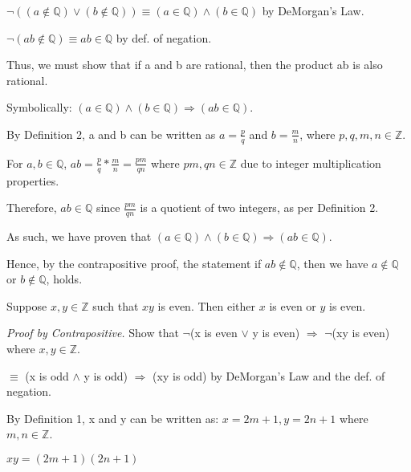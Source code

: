 \documentclass[a4paper,11pt]{article}
\begin{document}
$\neg ((a \not \in \mathbb{Q}) \vee (b \not \in \mathbb{Q})) \equiv (a \in \mathbb{Q}) \land (b \in \mathbb{Q})$ by DeMorgan's Law.

$\neg(ab \not \in \mathbb{Q}) \equiv ab \in \mathbb{Q}$ by def. of negation.

Thus, we must show that if a and b are rational, then the product ab is also rational.

Symbolically: $(a \in \mathbb{Q}) \land (b \in \mathbb{Q}) \Rightarrow (ab \in \mathbb{Q})$.

\phantom{}

By Definition 2, a and b can be written as $a = \frac{p}{q}$ and $b = \frac{m}{n}$, where $p,q,m,n \in \mathbb{Z}$.

For $a,b \in \mathbb{Q}$, $ab = \frac{p}{q}*\frac{m}{n} = \frac{pm}{qn}$ where $pm, qn \in \mathbb{Z}$ due to integer multiplication properties.

Therefore, $ab \in \mathbb{Q}$ since $\frac{pm}{qn}$ is a quotient of two integers, as per Definition 2.

As such, we have proven that $(a \in \mathbb{Q}) \land (b \in \mathbb{Q}) \Rightarrow (ab \in \mathbb{Q})$. 

\phantom{}

Hence, by the contrapositive proof, the statement if $ab \not \in \mathbb{Q}$, then we have $a \not \in \mathbb{Q}$ or $b \not \in \mathbb{Q}$, holds. \fbox \\

\begin{required}
Suppose $x, y \in \mathbb{Z}$ such that $xy$ is even. Then either $x$ is even or $y$ is even.
\end{required}
\emph{Proof by Contrapositive.} Show that $\neg$(x is even $\vee$ y is even) $\Rightarrow$ $\neg$(xy is even) where $x, y \in \mathbb{Z}$.

$\equiv$ (x is odd $\land$ y is odd) $\Rightarrow$ (xy is odd) by DeMorgan's Law and the def. of negation.

\phantom{}

By Definition 1, x and y can be written as: $x = 2m + 1, y = 2n + 1$ where $m,n \in \mathbb{Z}$.

$xy = (2m+1)(2n+1) $
\end{document}
